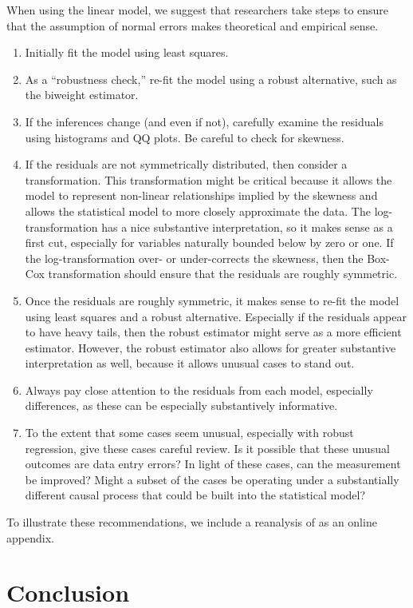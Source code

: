 \documentclass[12pt]{article}
\begin{document}
When using the linear model, we suggest that researchers take steps to ensure that the assumption of normal errors makes theoretical and empirical sense. 
\begin{enumerate}
	\item Initially fit the model using least squares. 
	\item As a ``robustness check,'' re-fit the model using a robust alternative, such as the biweight estimator. 
	\item If the inferences change (and even if not), carefully examine the residuals using histograms and QQ plots. Be careful to check for skewness.
	\item If the residuals are not symmetrically distributed, then consider a transformation. 
	This transformation might be critical because it allows the model to represent non-linear relationships implied by the skewness and allows the statistical model to more closely approximate the data. 
	The log-transformation has a nice substantive interpretation, so it makes sense as a first cut, especially for variables naturally bounded below by zero or one. 
	If the log-transformation over- or under-corrects the skewness, then the Box-Cox transformation should ensure that the residuals are roughly symmetric.
	\item Once the residuals are roughly symmetric, it makes sense to re-fit the model using least squares and a robust alternative. 
	Especially if the residuals appear to have heavy tails, then the robust estimator might serve as a more efficient estimator. 
	However, the robust estimator also allows for greater substantive interpretation as well, because it allows unusual cases to stand out.
	\item Always pay close attention to the residuals from each model, especially differences, as these can be especially substantively informative.
	\item To the extent that some cases seem unusual, especially with robust regression, give these cases careful review. 
	Is it possible that these unusual outcomes are  data entry errors? 
	In light of these cases, can the measurement be improved? 
	Might a subset of the cases be operating under a substantially different causal process that could be built into the statistical model? 
\end{enumerate}

To illustrate these recommendations, we include a reanalysis of \cite{ClarkGolder2006} as an online appendix. 

\section*{Conclusion}
\end{document}

